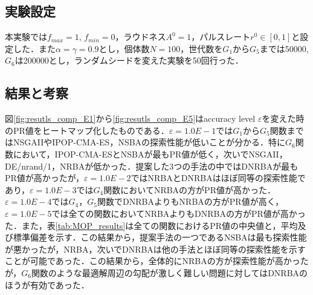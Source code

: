 \documentclass[a4j,11pt]{jarticle}
\begin{document}
\subsection{実験設定}
本実験では$f_{max}=1$, $f_{min}=0$，ラウドネス$A^0=1$，パルスレート$r^0 \in [0,1]$と設定した．また$\alpha= \gamma = 0.9$とし，個体数$N=100$，世代数を$G_1$から$G_5$までは50000, $G_6$は200000とし，ランダムシードを変えた実験を50回行った．

\subsection{結果と考察}
\label{ss:results}
図\ref{fig:resutls_comp_E1}から\ref{fig:resutls_comp_E5}はaccuracy level $\varepsilon$を変えた時のPR値をヒートマップ化したものである．$\varepsilon = 1.0E-1$では$G_1$から$G_5$関数まではNSGAIIやIPOP-CMA-ES，NSBAの探索性能が低いことが分かる．特に$G_6$関数において，IPOP-CMA-ESとNSBAが最もPR値が低く，次いでNSGAII，DE/nrand/1，NRBAが低かった．提案した3つの手法の中ではDNRBAが最もPR値が高かったが，$\varepsilon = 1.0E-2$ではNRBAとDNRBAはほぼ同等の探索性能であり，$\varepsilon=1.0E-3$では$G_4$関数においてNRBAの方がPR値が高かった．$\varepsilon=1.0E-4$では$G_4$，$G_5$関数でDNRBAよりもNRBAの方がPR値が高く，$\varepsilon = 1.0E-5$では全ての関数においてNRBAよりもDNRBAの方がPR値が高かった．また，表\ref{tab:MOP_results}は全ての関数におけるPR値の中央値と，平均及び標準偏差を示す．この結果から，提案手法の一つであるNSBAは最も探索性能が悪かったが，NRBA，次いでDNRBAは他の手法とほぼ同等の探索性能を示すことが可能であった．この結果から，全体的にNRBAの方が探索性能が高かったが，$G_6$関数のような最適解周辺の勾配が激しく難しい問題に対してはDNRBAのほうが有効であった．
\end{document}
